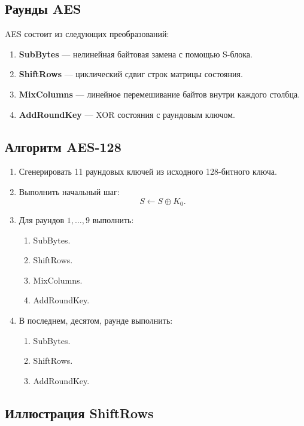 \documentclass[12pt,a4paper]{article}
\begin{document}
\subsection{Раунды AES}

AES состоит из следующих преобразований:

\begin{enumerate}
    \item \textbf{SubBytes} --- нелинейная байтовая замена с помощью S-блока.
    \item \textbf{ShiftRows} --- циклический сдвиг строк матрицы состояния.
    \item \textbf{MixColumns} --- линейное перемешивание байтов внутри каждого столбца.
    \item \textbf{AddRoundKey} --- XOR состояния с раундовым ключом.
\end{enumerate}

\subsection{Алгоритм AES-128}

\begin{enumerate}
    \item Сгенерировать 11 раундовых ключей из исходного 128-битного ключа.
    \item Выполнить начальный шаг:
    \[
        S \leftarrow S \oplus K_0.
    \]
    \item Для раундов $1,\ldots,9$ выполнить:
    \begin{enumerate}
        \item SubBytes.
        \item ShiftRows.
        \item MixColumns.
        \item AddRoundKey.
    \end{enumerate}
    \item В последнем, десятом, раунде выполнить:
    \begin{enumerate}
        \item SubBytes.
        \item ShiftRows.
        \item AddRoundKey.
    \end{enumerate}
\end{enumerate}

\subsection{Иллюстрация ShiftRows}
\end{document}
